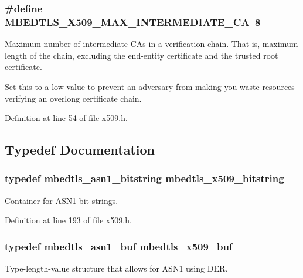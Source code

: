 \hypertarget{group__x509__module_gab98caf7dfede54b5c576b5a27a5c6a6a}{
\subsubsection[{M\-B\-E\-D\-T\-L\-S\-\_\-\-X509\-\_\-\-M\-A\-X\-\_\-\-I\-N\-T\-E\-R\-M\-E\-D\-I\-A\-T\-E\-\_\-\-C\-A}]{\setlength{\rightskip}{0pt plus 5cm}\#define M\-B\-E\-D\-T\-L\-S\-\_\-\-X509\-\_\-\-M\-A\-X\-\_\-\-I\-N\-T\-E\-R\-M\-E\-D\-I\-A\-T\-E\-\_\-\-C\-A~8}}\label{group__x509__module_gab98caf7dfede54b5c576b5a27a5c6a6a}
Maximum number of intermediate C\-As in a verification chain. That is, maximum length of the chain, excluding the end-\/entity certificate and the trusted root certificate.

Set this to a low value to prevent an adversary from making you waste resources verifying an overlong certificate chain. 

Definition at line 54 of file x509.\-h.



\subsection{Typedef Documentation}
\hypertarget{group__x509__module_gaf25a97602f25027e160f22f6d5590636}{
\subsubsection[{mbedtls\-\_\-x509\-\_\-bitstring}]{\setlength{\rightskip}{0pt plus 5cm}typedef {\bf mbedtls\-\_\-asn1\-\_\-bitstring} {\bf mbedtls\-\_\-x509\-\_\-bitstring}}}\label{group__x509__module_gaf25a97602f25027e160f22f6d5590636}
Container for A\-S\-N1 bit strings. 

Definition at line 193 of file x509.\-h.

\hypertarget{group__x509__module_ga4d02c9e8e4e2934555e0d132cd2976dc}{
\subsubsection[{mbedtls\-\_\-x509\-\_\-buf}]{\setlength{\rightskip}{0pt plus 5cm}typedef {\bf mbedtls\-\_\-asn1\-\_\-buf} {\bf mbedtls\-\_\-x509\-\_\-buf}}}\label{group__x509__module_ga4d02c9e8e4e2934555e0d132cd2976dc}
Type-\/length-\/value structure that allows for A\-S\-N1 using D\-E\-R. 


